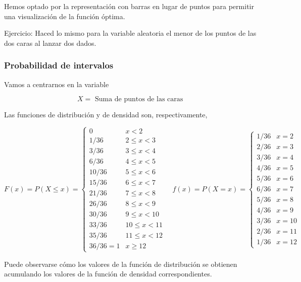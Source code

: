 \documentclass[
]{article}
\begin{document}
Hemos optado por la representación con barras en lugar de puntos para
permitir una visualización de la función óptima.

Ejercicio: Haced lo mismo para la variable aleatoria el menor de los
puntos de las dos caras al lanzar dos dados.

\subsubsection{Probabilidad de intervalos}\label{probabilidad-de-intervalos-1}

Vamos a centrarnos en la variable

\[
X=\text { Suma de puntos de las caras }
\]

Las funciones de distribución y de densidad son, respectivamente,

\[
F(x)=P(X \leq x)=\left\{\begin{array}{ll}
0 & x<2 \\
1 / 36 & 2 \leq x<3 \\
3 / 36 & 3 \leq x<4 \\
6 / 36 & 4 \leq x<5 \\
10 / 36 & 5 \leq x<6 \\
15 / 36 & 6 \leq x<7 \\
21 / 36 & 7 \leq x<8 \\
26 / 36 & 8 \leq x<9 \\
30 / 36 & 9 \leq x<10 \\
33 / 36 & 10 \leq x<11 \\
35 / 36 & 11 \leq x<12 \\
36 / 36=1 & x \geq 12
\end{array} \quad f(x)=P(X=x)= \begin{cases}1 / 36 & x=2 \\
2 / 36 & x=3 \\
3 / 36 & x=4 \\
4 / 36 & x=5 \\
5 / 36 & x=6 \\
6 / 36 & x=7 \\
5 / 36 & x=8 \\
4 / 36 & x=9 \\
3 / 36 & x=10 \\
2 / 36 & x=11 \\
1 / 36 & x=12\end{cases}\right.
\]

Puede observarse cómo los valores de la función de distribución se
obtienen acumulando los valores de la función de densidad
correspondientes.
\end{document}

